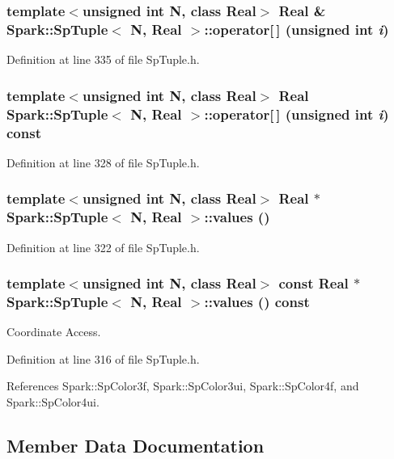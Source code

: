 \subsubsection{\setlength{\rightskip}{0pt plus 5cm}template$<$unsigned int N, class Real$>$ Real \& {\bf Spark::Sp\-Tuple}$<$ N, Real $>$::operator[$\,$] (unsigned int {\em i})}\label{classSpark_1_1SpTuple_a7}


Definition at line 335 of file Sp\-Tuple.h.
\subsubsection{\setlength{\rightskip}{0pt plus 5cm}template$<$unsigned int N, class Real$>$ Real {\bf Spark::Sp\-Tuple}$<$ N, Real $>$::operator[$\,$] (unsigned int {\em i}) const}\label{classSpark_1_1SpTuple_a6}


Definition at line 328 of file Sp\-Tuple.h.
\subsubsection{\setlength{\rightskip}{0pt plus 5cm}template$<$unsigned int N, class Real$>$ Real $\ast$ {\bf Spark::Sp\-Tuple}$<$ N, Real $>$::values ()}\label{classSpark_1_1SpTuple_a5}


Definition at line 322 of file Sp\-Tuple.h.
\subsubsection{\setlength{\rightskip}{0pt plus 5cm}template$<$unsigned int N, class Real$>$ const Real $\ast$ {\bf Spark::Sp\-Tuple}$<$ N, Real $>$::values () const}\label{classSpark_1_1SpTuple_a4}


Coordinate Access. 

Definition at line 316 of file Sp\-Tuple.h.

References Spark::Sp\-Color3f, Spark::Sp\-Color3ui, Spark::Sp\-Color4f, and Spark::Sp\-Color4ui.

\subsection{Member Data Documentation}
